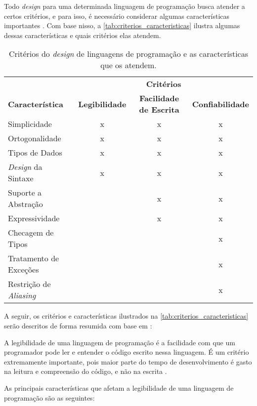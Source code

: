 Todo \textit{design} para uma determinada linguagem de programação busca atender a certos critérios, e para isso, é necessário considerar algumas características importantes \cite{conceptsoflanguages}. Com base nisso, a \autoref{tab:criterios_caracteristicas} ilustra algumas dessas características e quais critérios elas atendem.

\begin{table}[h]
	\centering
	\caption{Critérios do \textit{design} de linguagens de programação e as características que os atendem.}
	{
		\begin{tabular}{lccc}
		\hline
		& \multicolumn{3}{c}{\textbf{Critérios}} \\
		\cline{2-4}
		\textbf{Característica} & \textbf{Legibilidade} & \textbf{Facilidade de Escrita} & \textbf{Confiabilidade} \\
		Simplicidade & x & x & x \\
		Ortogonalidade & x & x & x \\
		Tipos de Dados & x & x & x \\
		\textit{Design} da Sintaxe & x & x & x \\
		Suporte a Abstração & & x & x \\
		Expressividade & & x & x \\
		Checagem de Tipos & & & x \\
		Tratamento de Exceções & & & x \\
		Restrição de \textit{Aliasing} & & & x \\
		\hline
		\end{tabular}
	}
	\label{tab:criterios_caracteristicas}
\end{table}

A seguir, os critérios e características ilustrados na \autoref{tab:criterios_caracteristicas} serão descritos de forma resumida com base em :


A legibilidade de uma linguagem de programação é a facilidade com que um programador pode ler e entender o código escrito nessa linguagem. É um critério extremamente importante, pois maior parte do tempo de desenvolvimento é gasto na leitura e compreensão do código, e não na escrita \cite{howdevsspendtime}.

As principais características que afetam a legibilidade de uma linguagem de programação são as seguintes:


